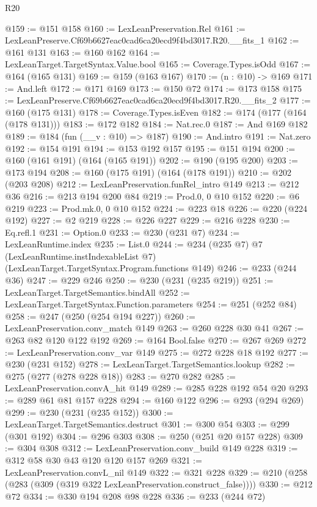\begin{lexlean}{R20}
\begin{coremodule}
@159 := @151 @158
@160 := LexLeanPreservation.Rel
@161 := LexLeanPreserve.Cf69b6627eac0cad6ca20ecd9f4bd3017.R20.__fits_1
@162 := @161 @131
@163 := @160 @162
@164 := LexLeanTarget.TargetSyntax.Value.bool
@165 := Coverage.Types.isOdd
@167 := @164 (@165 @131)
@169 := @159 (@163 @167)
@170 := (n : @10) -> @169
@171 := And.left
@172 := @171 @169
@173 := @150 @72
@174 := @173 @158
@175 := LexLeanPreserve.Cf69b6627eac0cad6ca20ecd9f4bd3017.R20.__fits_2
@177 := @160 (@175 @131)
@178 := Coverage.Types.isEven
@182 := @174 (@177 (@164 (@178 @131)))
@183 := @172 @182
@184 := Nat.rec.{0}
@187 := And @169 @182
@189 := @184 (fun (__v : @10) => @187)
@190 := And.intro
@191 := Nat.zero
@192 := @154 @191
@194 := @153 @192 @157
@195 := @151 @194
@200 := @160 (@161 @191) (@164 (@165 @191))
@202 := @190 (@195 @200)
@203 := @173 @194
@208 := @160 (@175 @191) (@164 (@178 @191))
@210 := @202 (@203 @208)
@212 := LexLeanPreservation.funRel_intro @149
@213 := @212 @36
@216 := @213 @194 @200 @84
@219 := Prod.{0, 0} @10 @152
@220 := @6 @219
@223 := Prod.mk.{0, 0} @10 @152
@224 := @223 @18
@226 := @220 (@224 @192)
@227 := @2 @219
@228 := @226 @227
@229 := @216 @228
@230 := Eq.refl.{1}
@231 := Option.{0}
@233 := @230 (@231 @7)
@234 := LexLeanRuntime.index
@235 := List.{0}
@244 := @234
    (@235 @7)
    @7
    (LexLeanRuntime.instIndexableList @7)
    (LexLeanTarget.TargetSyntax.Program.functions @149)
@246 := @233 (@244 @36)
@247 := @229 @246
@250 := @230 (@231 (@235 @219))
@251 := LexLeanTarget.TargetSemantics.bindAll
@252 := LexLeanTarget.TargetSyntax.Function.parameters
@254 := @251 (@252 @84)
@258 := @247 (@250 (@254 @194 @227))
@260 := LexLeanPreservation.conv_match @149
@263 := @260 @228 @30 @41
@267 := @263 @82 @120 @122 @192
@269 := @164 Bool.false
@270 := @267 @269
@272 := LexLeanPreservation.conv_var @149
@275 := @272 @228 @18 @192
@277 := @230 (@231 @152)
@278 := LexLeanTarget.TargetSemantics.lookup
@282 := @275 (@277 (@278 @228 @18))
@283 := @270 @282
@285 := LexLeanPreservation.convA_hit @149
@289 := @285 @228 @192 @54 @20
@293 := @289 @61 @81 @157 @228
@294 := @160 @122
@296 := @293 (@294 @269)
@299 := @230 (@231 (@235 @152))
@300 := LexLeanTarget.TargetSemantics.destruct
@301 := @300 @54
@303 := @299 (@301 @192)
@304 := @296 @303
@308 := @250 (@251 @20 @157 @228)
@309 := @304 @308
@312 := LexLeanPreservation.conv_build @149 @228
@319 := @312 @58 @30 @43 @120 @120 @157 @269
@321 := LexLeanPreservation.convL_nil @149
@322 := @321 @228
@329 := @210 (@258 (@283 (@309 (@319 @322 LexLeanPreservation.construct_false))))
@330 := @212 @72
@334 := @330 @194 @208 @98 @228
@336 := @233 (@244 @72)

\end{coremodule}
\end{lexlean}
